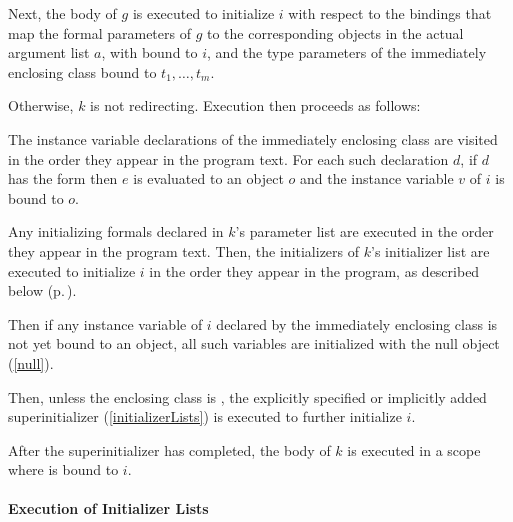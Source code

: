 \documentclass[makeidx]{article}
\begin{document}
\LMHash{}%
Next, the body of $g$ is executed to initialize $i$ with respect to the bindings that map
the formal parameters of $g$ to the corresponding objects in the actual argument list $a$,
with \THIS{} bound to $i$,
and the type parameters of the immediately enclosing class bound to $t_1, \ldots, t_m$.

\LMHash{}%
Otherwise, $k$ is not redirecting.
Execution then proceeds as follows:

\LMHash{}%
The instance variable declarations of the immediately enclosing class
are visited in the order they appear in the program text.
For each such declaration $d$, if $d$ has the form
then $e$ is evaluated to an object $o$
and the instance variable $v$ of $i$ is bound to $o$.

\LMHash{}%
Any initializing formals declared in $k$'s parameter list are executed in the order they appear in the program text.
Then, the initializers of $k$'s initializer list are executed to initialize $i$
in the order they appear in the program, as described below
(p.\,\pageref{executionOfInitializerLists}).


\LMHash{}%
Then if any instance variable of $i$ declared by the immediately enclosing class
is not yet bound to an object,
all such variables are initialized with the null object (\ref{null}).

\LMHash{}%
Then, unless the enclosing class is , the explicitly specified or
implicitly added superinitializer (\ref{initializerLists}) is executed to
further initialize $i$.

\LMHash{}%
After the superinitializer has completed, the body of $k$ is executed in a scope where \THIS{} is bound to $i$.



\paragraph{Execution of Initializer Lists}
\end{document}
